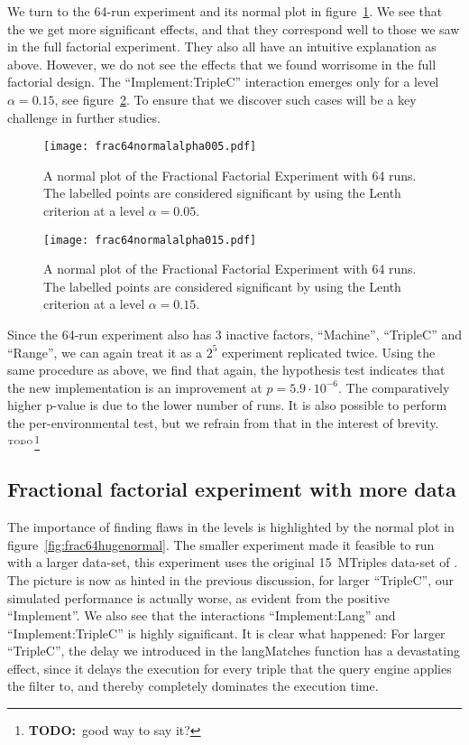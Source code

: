\documentclass{llncs}
\newcommand{\todo}[1]{\ensuremath{^{\textrm{\tiny{TODO}\normalsize}}}\footnote{\textbf{TODO:}~#1}}
\begin{document}
We turn to the 64-run experiment and its normal plot in
figure~\ref{fig:frac64normalalpha005}. We see that the we get more significant
effects, and that they correspond well to those we saw in the full
factorial experiment. They also all have an intuitive
explanation as above. However, we do not see the effects that we found
worrisome in the full factorial design. The ``Implement:TripleC''
interaction emerges only for a level $\alpha=0.15$, see
figure~\ref{fig:frac64normalalpha015}. To ensure that we discover such
cases will be a key challenge in further studies.

\begin{figure}[ht]
  \texttt{[image: frac64normalalpha005.pdf]}
  \caption{A normal plot of the Fractional Factorial Experiment with
    64 runs. The labelled points are considered significant by using
    the Lenth criterion at a level
    $\alpha=0.05$.}\label{fig:frac64normalalpha005}
\end{figure}
\begin{figure}[hb]
  \texttt{[image: frac64normalalpha015.pdf]}
  \caption{A normal plot of the Fractional Factorial Experiment with
    64 runs. The labelled points are considered significant by using
    the Lenth criterion at a level
    $\alpha=0.15$.}\label{fig:frac64normalalpha015}
\end{figure}

Since the 64-run experiment also has 3 inactive factors, ``Machine'',
``TripleC'' and ``Range'', we can again treat it as a $2^5$ experiment
replicated twice. Using the same procedure as above, we find that
again, the hypothesis test indicates that the new implementation is an
improvement at $p = 5.9 \cdot 10^{-6}$. The comparatively higher p-value
is due to the lower number of runs. It is also possible to perform the
per-environmental test, but we refrain from that in the interest of
brevity.\todo{good way to say it?}


\subsection{Fractional factorial experiment with more data}

The importance of finding flaws in the levels is highlighted by the
normal plot in figure~\ref{fig:frac64hugenormal}. The smaller
experiment made it feasible to run with a larger data-set, this
experiment uses the original 15~MTriples data-set of
\cite{mxro:Morsey2011DBpedia}. The picture is now as hinted in the
previous discussion, for larger ``TripleC'', our simulated performance
is actually worse, as evident from the positive ``Implement''. We also
see that the interactions ``Implement:Lang'' and ``Implement:TripleC''
is highly significant. It is clear what happened: For larger
``TripleC'', the delay we introduced in the langMatches function has a
devastating effect, since it delays the execution for every triple
that the query engine applies the filter to, and thereby completely
dominates the execution time.
\end{document}
